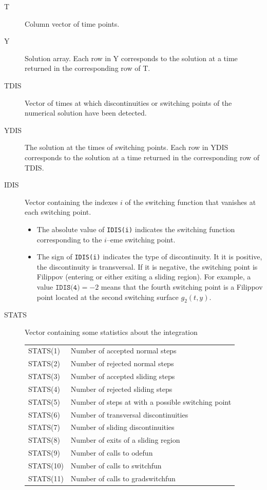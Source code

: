 \documentclass{article}
\begin{document}
\begin{description}
\item[T]
Column vector of time points.
\item[Y]
Solution array. Each row in Y corresponds to the solution at a time returned in the corresponding row of T.
\item[TDIS]
Vector of times at which discontinuities or switching points of the numerical solution have been detected.
\item[YDIS]
The solution at the times of switching points. Each row in YDIS corresponds to the
solution at a time returned in the corresponding row of TDIS.
\item[IDIS]
Vector containing the indexes $i$ of the switching function that vanishes at each switching point.
\begin{itemize}
\item
The absolute value of \texttt{IDIS(i)} indicates the switching function corresponding to the $i$--eme switching point.
\item
The sign of \texttt{IDIS(i)} indicates the type
of discontinuity. It it is positive, the discontinuity is
transversal. If it is negative, the switching point is Filippov (entering or either exiting a sliding region).  For example, a value $\texttt{IDIS(4)}=-2$ means that the fourth switching point is a Filippov point located at the second switching surface $g_2(t,y)$.
\end{itemize}
\item[STATS]
Vector containing some statistics about the integration

\begin{tabular}{ll}
STATS(1) &  Number of accepted normal steps \\
STATS(2) &  Number of rejected normal steps \\
STATS(3) &  Number of accepted sliding steps\\
STATS(4) &  Number of rejected sliding steps\\
STATS(5) &  Number of steps at with a possible switching point\\
STATS(6) &  Number of transversal discontinuities \\
STATS(7) &  Number of sliding discontinuities \\
STATS(8) &  Number of exits of a sliding region\\
STATS(9) &  Number of calls to odefun\\
STATS(10) & Number of calls to switchfun \\
STATS(11) & Number of calls to gradswitchfun \\
\end{tabular}
\end{description}
\end{document}
